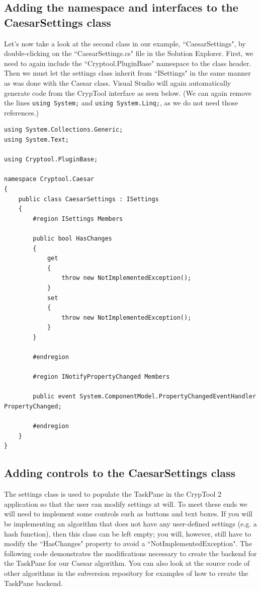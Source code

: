 \subsection{Adding the namespace and interfaces to the CaesarSettings class}
\label{sec:AddingTheNamespaceAndInterfacesToTheCaesarSettingsClass}

Let's now take a look at the second class in our example, ``CaesarSettings", by double-clicking on the ``CaesarSettings.cs" file in the Solution Explorer. First, we need to again include the ``Cryptool.PluginBase" namespace to the class header. Then we must let the settings class inherit from ``ISettings" in the same manner as was done with the Caesar class. Visual Studio will again automatically generate code from the CrypTool interface as seen below. (We can again remove the lines \texttt{using System;} and \texttt{using System.Linq;}, as we do not need those references.)\\

\begin{lstlisting}
using System.Collections.Generic;
using System.Text;

using Cryptool.PluginBase;

namespace Cryptool.Caesar
{
    public class CaesarSettings : ISettings
    {
        #region ISettings Members

        public bool HasChanges
        {
            get
            {
                throw new NotImplementedException();
            }
            set
            {
                throw new NotImplementedException();
            }
        }

        #endregion

        #region INotifyPropertyChanged Members

        public event System.ComponentModel.PropertyChangedEventHandler PropertyChanged;

        #endregion
    }
}
\end{lstlisting}

\subsection{Adding controls to the CaesarSettings class}
\label{sec:AddingControlsToTheCaesarSettingsClass}

The settings class is used to populate the TaskPane in the CrypTool 2 application so that the user can modify settings at will. To meet these ends we will need to implement some controls such as buttons and text boxes. If you will be implementing an algorithm that does not have any user-defined settings (e.g. a hash function), then this class can be left empty; you will, however, still have to modify the ``HasChanges" property to avoid a ``NotImplementedException". The following code demonstrates the modifications necessary to create the backend for the TaskPane for our Caesar algorithm. You can also look at the source code of other algorithms in the subversion repository for examples of how to create the TaskPane backend.\\

